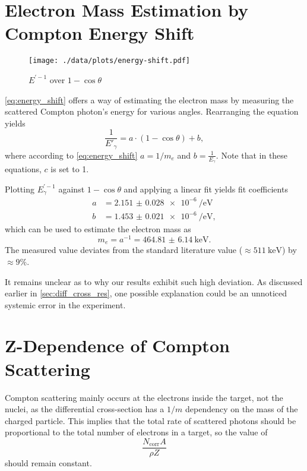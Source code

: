 \section{Electron Mass Estimation by Compton Energy Shift}
\begin{figure}
	\centering
	\texttt{[image: ./data/plots/energy-shift.pdf]}
	\caption{$E^{'-1}$ over $1-\cos\theta$}
	\label{fig:energy_shift}
\end{figure}

\autoref{eq:energy_shift} offers a way of estimating the electron mass by measuring the scattered Compton photon's energy for various angles.
Rearranging the equation yields
\begin{equation*}
	\frac{1}{E'_\gamma} = a\cdot\left(1-\cos\theta\right) + b,
\end{equation*}
where according to \autoref{eq:energy_shift} $a=1/m_e$ and $b=\frac{1}{E_\gamma}$.
Note that in these equations, $c$ is set to 1.

Plotting $E_\gamma^{'-1}$ against $1-\cos\theta$ and applying a linear fit yields fit coefficients
\begin{align*}
	a &= \SI{2.151(28)e-6}{\per\eV} \\
	b &= \SI{1.453(21)e-6}{\per\eV},
\end{align*}
which can be used to estimate the electron mass as
\begin{equation*}
	m_e = a^{-1} = \SI{464.81(614)}{\keV}.
\end{equation*}
The measured value deviates from the standard literature value \cite{pdg} ($\approx\SI{511}{\keV}$) by $\approx 9\%$.

It remains unclear as to why our results exhibit such high deviation.
As discussed earlier in \autoref{sec:diff_cross_res}, one possible explanation could be an unnoticed systemic error in the experiment.

\section{Z-Dependence of Compton Scattering} %
Compton scattering mainly occurs at the electrons inside the target, not the nuclei, as the differential cross-section has a $1/m$ dependency on the mass of the charged particle.
This implies that the total rate of scattered photons should be proportional to the total number of electrons in a target, so the value of
\begin{equation}\label{eq_const-stuff}
	\frac{N_\text{corr} A}{\rho Z}
\end{equation}
should remain constant.

